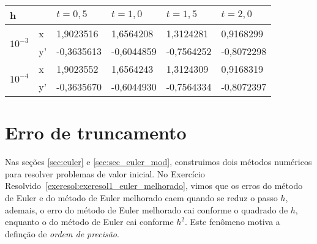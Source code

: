 \begin{resp} \begin{center}
 \begin{tabular}{|l|l|l|l|l|l|}%
\hline
   h&&$t=0,5$&$t=1,0$&$t=1,5$&$t=2,0$\\
   \hline
   \multirow{2}{*}{$10^{-3}$} &x & 1,9023516 &1,6564208&1,3124281&0,9168299\\
		              &y'& -0,3635613&-0,6044859&-0,7564252& -0,8072298\\
   \hline

   \multirow{2}{*}{$10^{-4}$} &x & 1,9023552 & 1,6564243 & 1,3124309 & 0,9168319\\
		              &y'& -0,3635670&-0,6044930&-0,7564334& -0,8072397 \\
   \hline

   \end{tabular}
\end{center}

\end{resp}



\section{Erro de truncamento}\label{sec:erro_truncamento}
Nas seções \ref{sec:euler} e \ref{sec:sec_euler_mod}, construimos dois métodos numéricos para resolver problemas de valor inicial. No Exercício Resolvido~\ref{exeresol:exeresol1_euler_melhorado}, vimos que os erros do método de Euler e do método de Euler melhorado caem quando se reduz o passo $h$, ademais, o erro do método de Euler melhorado cai conforme o quadrado de $h$, enquanto o do método de Euler cai conforme $h^2$. Este fenômeno motiva a definção de \emph{ordem de precisão}.

